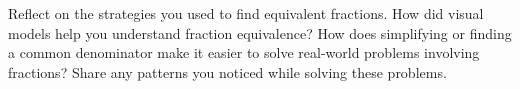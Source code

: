 \documentclass[12pt]{article}
\begin{document}
\vspace{1em}

\begin{tcolorbox}[colframe=black!60, colback=white, 
coltitle=black, colbacktitle=black!15, fonttitle=\bfseries\Large, 
title=Reflection, halign title=center, left=10pt, right=10pt, top=10pt, bottom=80pt]
Reflect on the strategies you used to find equivalent fractions. How did visual models help you understand fraction equivalence? How does simplifying or finding a common denominator make it easier to solve real-world problems involving fractions? Share any patterns you noticed while solving these problems.
\vspace{1cm}
\end{tcolorbox}
\end{document}
